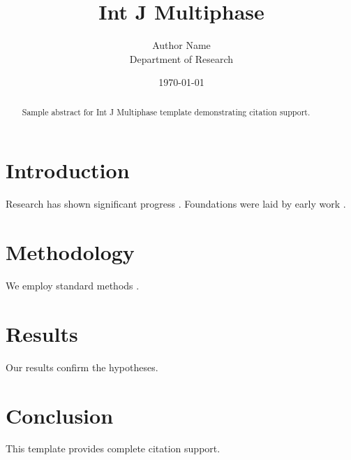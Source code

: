 \documentclass{llncs}
\title{Int J Multiphase}
\author{Author Name \\ \small Department of Research}
\date{\today}
\begin{document}
\maketitle

\begin{abstract}
Sample abstract for Int J Multiphase template demonstrating citation support.
\end{abstract}

\section{Introduction}
Research has shown significant progress \citep{einstein1905}. Foundations were laid by early work \citep{turing1950}.

\section{Methodology}
We employ standard methods \citep{knuth1984}.

\section{Results}
Our results confirm the hypotheses.

\section{Conclusion}
This template provides complete citation support.



\end{document}
